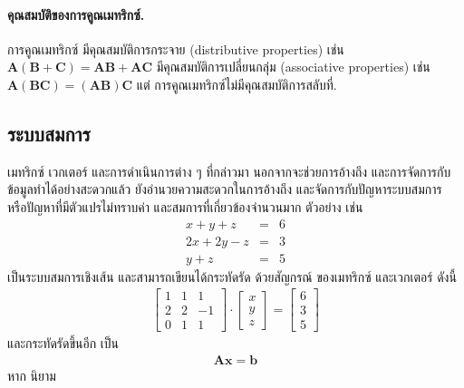 \paragraph{คุณสมบัติของการคูณเมทริกซ์.}
การคูณเมทริกซ์
มีคุณสมบัติการกระจาย (distributive properties)
เช่น $\bm{A} (\bm{B} + \bm{C}) = \bm{A} \bm{B} + \bm{A} \bm{C}$
มีคุณสมบัติการเปลี่ยนกลุ่ม (associative properties)
เช่น $\bm{A} (\bm{B} \bm{C}) = (\bm{A} \bm{B}) \bm{C}$
แต่
การคูณเมทริกซ์ไม่มีคุณสมบัติการสลับที่.


\subsection{ระบบสมการ}
เมทริกซ์ เวกเตอร์ และการดำเนินการต่าง ๆ ที่กล่าวมา นอกจากจะช่วยการอ้างถึง และการจัดการกับข้อมูลทำได้อย่างสะดวกแล้ว
ยังอำนวยความสะดวกในการอ้างถึง และจัดการกับปัญหาระบบสมการ หรือปัญหาที่มีตัวแปรไม่ทราบค่า และสมการที่เกี่ยวข้องจำนวนมาก 
ตัวอย่าง เช่น
\begin{eqnarray}
x + y + z &=& 6
\label{eq: lin alg ex 1} \\
2 x + 2 y - z &=& 3
\label{eq: lin alg ex 2} \\
y + z &=& 5
\label{eq: lin alg ex 3}
\end{eqnarray}
เป็นระบบสมการเชิงเส้น และสามารถเขียนได้กระทัดรัด ด้วยสัญกรณ์ ของเมทริกซ์ และเวกเตอร์ ดังนี้
%
\begin{eqnarray}
\begin{bmatrix}
1 & 1 & 1 \\
2 & 2 & -1 \\
0 & 1 & 1
\end{bmatrix}
\cdot
\begin{bmatrix}
x \\
y \\
z
\end{bmatrix}
=
\begin{bmatrix}
6 \\
3 \\
5
\end{bmatrix}
\nonumber
\end{eqnarray}
และกระทัดรัดขึ้นอีก 
เป็น 
\begin{eqnarray}
\bm{A} \bm{x} = \bm{b}
\label{eq: lin alg example lin sys}
\end{eqnarray}
หาก นิยาม
